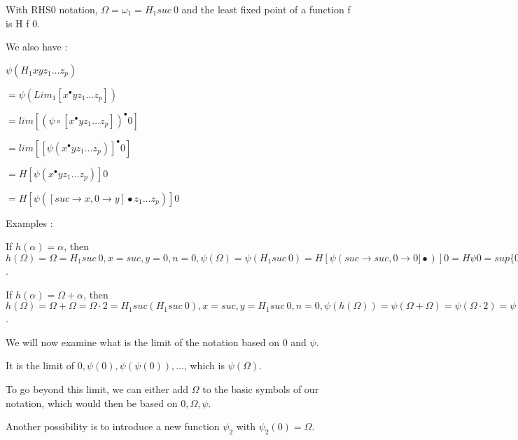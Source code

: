 \documentclass[10pt]{article}
\begin{document}
\bigskip

With RHS0 notation, \( \Omega = \omega_1 = H_1 suc\ 0 \) and the least fixed point of a function f is H f 0.

We also have :

\( \psi (H_1 x y z_1 \ldots z_p) \)

\( = \psi (Lim_1 [x^\bullet y z_1 \ldots z_p]) \)

\( = lim [(\psi \circ [x^\bullet y z_1 \ldots z_p])^\bullet 0] \)

\( = lim [[\psi (x^\bullet y z_1 \ldots z_p)]^\bullet 0] \)

\( = H [\psi (x^\bullet y z_1 \ldots z_p)] 0 \)

\( = H [\psi ([suc \rightarrow x, 0 \rightarrow y] \bullet z_1 \ldots z_p)] 0 \) 

\bigskip

Examples :

If \( h(\alpha) = \alpha \), then \( h(\Omega) = \Omega = H_1 suc\ 0, x = suc, y = 0, n = 0, \psi(\Omega) = \psi(H_1 suc\ 0) = H [\psi(suc \rightarrow suc, 0 \rightarrow 0] \bullet)] 0 = H \psi 0 = sup \lbrace 0, \psi(0), \psi(\psi(0)), \ldots \rbrace \).

If \( h(\alpha) = \Omega+\alpha \), then \( h(\Omega) = \Omega+\Omega = \Omega \cdot 2 = H_1 suc (H_1 suc\ 0), x = suc, y = H_1 suc\ 0, n = 0, \psi(h(\Omega)) = \psi(\Omega+\Omega) = \psi(\Omega \cdot 2) = \psi(H_1 suc (H_1 suc\ 0)) = H [\psi([suc \rightarrow suc, 0 \rightarrow H_1 suc\ 0] \bullet)] 0 = sup \lbrace 0, \psi([suc \rightarrow suc, 0 \rightarrow H_1 suc\ 0] 0) = \psi(H_1 suc\ 0) = \psi(\Omega),  \psi([suc \rightarrow suc, 0 \rightarrow H_1 suc\ 0] (\psi(\Omega))) = \psi(\Omega+\psi(\Omega)), \ldots \rbrace \).

\bigskip

We will now examine what is the limit of the notation based on \( 0 \) and \( \psi \).

It is the limit of \( 0, \psi(0), \psi(\psi(0)), \ldots \), which is \( \psi(\Omega) \).

To go beyond this limit, we can either add \( \Omega \) to the basic symbols of our notation, which would then be based on \( 0, \Omega, \psi \).

Another possibility is to introduce a new function \( \psi_2 \) with \( \psi_2(0) = \Omega \).

\bigskip
\end{document}
